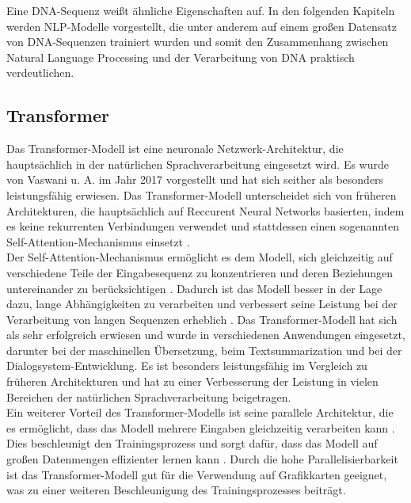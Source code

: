 \documentclass[oneside,bibliography=totocnumbered,BCOR=5mm]{scrbook}%
\theoremstyle{definition}
\theoremstyle{definition}
\theoremstyle{definition}
\theoremstyle{definition}
\theoremstyle{definition}
\theoremstyle{definition}
\begin{document}
Eine DNA-Sequenz weißt ähnliche Eigenschaften auf. In den folgenden Kapiteln werden 
NLP-Modelle vorgestellt, die unter anderem auf einem großen Datensatz von DNA-Sequenzen 
trainiert wurden und somit den Zusammenhang zwischen Natural Language Processing und der
Verarbeitung von DNA praktisch verdeutlichen. \\


\subsection{Transformer}


Das Transformer-Modell ist eine neuronale Netzwerk-Architektur, 
die hauptsächlich in der natürlichen Sprachverarbeitung eingesetzt wird. 
Es wurde von Vaswani u. A. \autocite{transformer} im Jahr 2017 vorgestellt und 
hat sich seither als besonders leistungsfähig erwiesen. 
Das Transformer-Modell unterscheidet sich von früheren Architekturen, 
die hauptsächlich auf Reccurent Neural Networks basierten, 
indem es keine rekurrenten Verbindungen verwendet und stattdessen einen sogenannten 
Self-Attention-Mechanismus einsetzt \autocite[Seite 1]{transformer}. \\


Der Self-Attention-Mechanismus ermöglicht es dem Modell, sich gleichzeitig auf verschiedene 
Teile der Eingabesequenz zu konzentrieren und deren Beziehungen untereinander zu 
berücksichtigen \autocite[Seite 1]{transformer}. 
Dadurch ist das Modell besser in der Lage dazu, lange Abhängigkeiten zu verarbeiten und 
verbessert seine Leistung bei der Verarbeitung von langen Sequenzen erheblich \autocite[Seite 1]{transformer}. 
Das Transformer-Modell hat sich als sehr erfolgreich erwiesen und wurde in verschiedenen Anwendungen eingesetzt, 
darunter bei der maschinellen Übersetzung, beim Textsummarization und bei der Dialogsystem-Entwicklung. 
Es ist besonders leistungsfähig im Vergleich zu früheren Architekturen und hat zu einer Verbesserung der Leistung 
in vielen Bereichen der natürlichen Sprachverarbeitung beigetragen. \\


Ein weiterer Vorteil des Transformer-Modells ist seine parallele Architektur, die es ermöglicht, 
dass das Modell mehrere Eingaben gleichzeitig verarbeiten kann \autocite[Seite 2]{transformer}. 
Dies beschleunigt den Trainingsprozess und sorgt dafür, dass das Modell
auf großen Datenmengen effizienter lernen kann \autocite[Seite 8]{transformer}. 
Durch die hohe Parallelisierbarkeit ist das Transformer-Modell gut für die Verwendung auf Grafikkarten geeignet, 
was zu einer weiteren Beschleunigung des Trainingsprozesses beiträgt. \\
\end{document}
